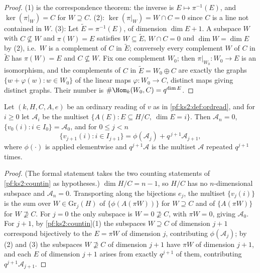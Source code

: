 \begin{proof}
(1) is the correspondence theorem: the inverse is $E\mapsto\pi^{-1}(E)$, and $\ker(\pi|_W)=C$ for
$W\supseteq C$. (2): $\ker(\pi|_W)=W\cap C=0$ since $C$ is a line not contained in $W$. (3): Let
$\tilde E=\pi^{-1}(E)$, of dimension $\dim E+1$. A subspace $W$ with $C\not\subseteq W$ and
$\pi(W)=E$ satisfies $W\subseteq\tilde E$, $W\cap C=0$ and $\dim W=\dim E$ by (2), i.e.\ $W$ is a
complement of $C$ in $\tilde E$; conversely every complement $W$ of $C$ in $\tilde E$ has
$\pi(W)=E$ and $C\not\subseteq W$. Fix one complement $W_0$; then $\pi|_{W_0}\colon W_0\to E$ is an
isomorphism, and the complements of $C$ in $\tilde E=W_0\oplus C$ are exactly the graphs
$\{w+\varphi(w):w\in W_0\}$ of the linear maps $\varphi\colon W_0\to C$, distinct maps giving distinct
graphs. Their number is $\#\Hom_k(W_0,C)=q^{\dim E}$.
\end{proof}

\begin{lemma}[Decomposition]\label{pf:ks2:orddecomp}
Let $(k,H,C,A,e)$ be an ordinary reading of $v$ as in \cref{pf:ks2:def:ordread}, and for $i\ge0$
let $\mathcal A_i$ be the multiset $\{A(E):E\subseteq H/C,\ \dim E=i\}$. Then $\mathcal A_n=0$,
$\{v_0(i):i\in I_0\}=\mathcal A_0$, and for $0\le j<n$
\begin{equation}\label{pf:ks2:eq:decomp}
\{v_{j+1}(i):i\in I_{j+1}\}=\phi(\mathcal A_j)+q^{\,j+1}\mathcal A_{j+1},
\end{equation}
where $\phi(\cdot)$ is applied elementwise and $q^{j+1}\mathcal A$ is the multiset $\mathcal A$
repeated $q^{j+1}$ times.
\end{lemma}

\begin{proof}
(The formal statement takes the two counting statements of \cref{pf:ks2:countin} as hypotheses.)
$\dim H/C=n-1$, so $H/C$ has no $n$-dimensional subspace and $\mathcal A_n=0$. Transporting along
the bijections $e_j$, the multiset $\{v_j(i)\}$ is the sum over $W\in\mathrm{Gr}_j(H)$ of
$\{\phi(A(\pi W))\}$ for $W\supseteq C$ and of $\{A(\pi W)\}$ for $W\not\supseteq C$. For $j=0$ the
only subspace is $W=0\not\supseteq C$, with $\pi W=0$, giving $\mathcal A_0$. For $j+1$, by
\cref{pf:ks2:countin}(1) the subspaces $W\supseteq C$ of dimension $j+1$ correspond bijectively to the
$E=\pi W$ of dimension $j$, contributing $\phi(\mathcal A_j)$; by (2) and (3) the subspaces
$W\not\supseteq C$ of dimension $j+1$ have $\pi W$ of dimension $j+1$, and each $E$ of dimension $j+1$
arises from exactly $q^{j+1}$ of them, contributing $q^{j+1}\mathcal A_{j+1}$.
\end{proof}

